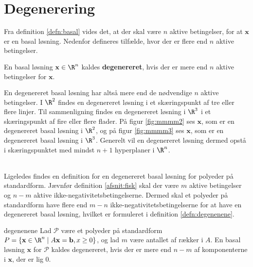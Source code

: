 \section{Degenerering}
Fra definition \ref{defn:basal} vides det, at der skal være $n$ aktive betingelser, for at $\mathbf{x}$ er en basal løsning. 
Nedenfor defineres tilfælde, hvor der er flere end $n$ aktive betingelser. 
%
\begin{defn}{}{}
En basal løsning $\mathbf{x} \in \R^n$ kaldes \textbf{degenereret}, hvis der er mere end $n$ aktive betingelser for $\mathbf{x}$.
\end{defn}
\noindent
%
En degenereret basal løsning har altså mere end de nødvendige $n$ aktive betingelser.
% 
I $\R^2$ findes en degenereret løsning i et skæringspunkt af tre eller flere linjer. 
Til sammenligning findes en degenereret løsning i $\R^3$ i et skæringspunkt af fire eller flere flader. 
På figur \ref{fig:mmmm2} ses $\mathbf{x}$, som er en degenereret basal løsning i $\R^2$, og på figur  \ref{fig:mmmm3} ses $\mathbf{x}$, som er en degenereret basal løsning i $\R^3$.
Generelt vil en degenereret løsning dermed opstå i skæringspunktet med mindst $n+1$ hyperplaner i $\R^n$.
%
%
\begin{center}
$
\begin{array}{cc}
&

\end{array}
$
\end{center}
%
%
Ligeledes findes en definition for en degenereret basal løsning for polyeder på standardform. 
Jævnfør definition \ref{afsnit:fisk} skal der være $m$ aktive betingelser og $n-m$ aktive ikke-negativitetsbetingelserne. 
Dermed skal et polyeder på standardform have flere end $m-n$ ikke-negativitetsbetingelserne for at have en degenereret basal løsning, hvilket er formuleret i definition \ref{defn:degenenene}. 
%
\begin{defn}{}{degenenene}
Lad $\mathcal{P}$ være et polyeder på standardform
$P=\{ \mathbf{x} \in \R^n \mid A \mathbf{x}=\mathbf{b},x \geq 0 \}$, og lad $m$ være antallet af rækker i $A$.
En basal løsning $\mathbf{x}$ for $\mathcal{P}$ kaldes degenereret, hvis der er mere end $n-m$ af komponenterne i $\mathbf{x}$, der er lig $0$.
\end{defn}
%
